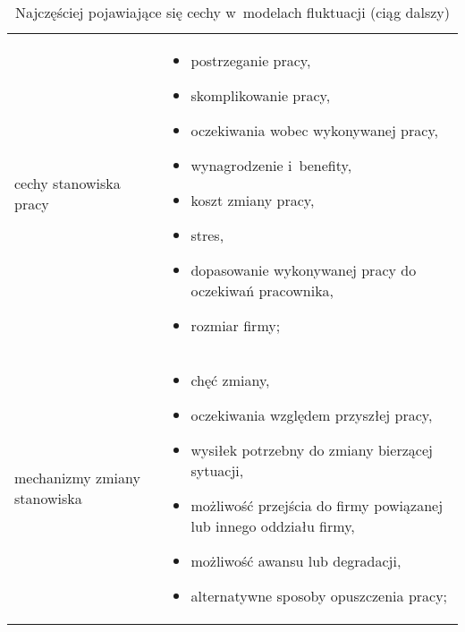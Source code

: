 \noindent\begin{minipage}{\textwidth}
             \begin{table}[H]
                 \raggedright\caption{Najczęściej pojawiające się cechy w~modelach fluktuacji (ciąg dalszy)\label{tabela:fluktuacja-cechy-2}}
                 \begin{center}
                     \begin{tabular}{|P{.2\textwidth}|P{.7\textwidth}|}

                         \hline
                          &
                          \\
                         \hline

                         cechy stanowiska pracy &
                         \begin{itemize}
                             \item postrzeganie pracy,
                             \item skomplikowanie pracy,
                             \item oczekiwania wobec wykonywanej pracy,
                             \item wynagrodzenie i~benefity,
                             \item koszt zmiany pracy,
                             \item stres,
                             \item dopasowanie wykonywanej pracy do oczekiwań pracownika,
                             \item rozmiar firmy;
                         \end{itemize} \\
                         \hline

                         mechanizmy zmiany stanowiska &
                         \begin{itemize}
                             \item chęć zmiany,
                             \item oczekiwania względem przyszłej pracy,
                             \item wysiłek potrzebny do zmiany bierzącej sytuacji,
                             \item możliwość przejścia do firmy powiązanej lub innego oddziału firmy,
                             \item możliwość awansu lub degradacji,
                             \item alternatywne sposoby opuszczenia pracy;
                         \end{itemize} \\
                         \hline


\end{tabular}
\end{center}
\end{table}
\end{minipage}

